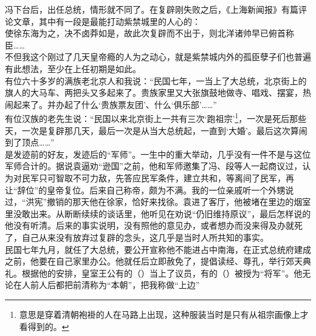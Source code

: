 冯下台后，出任总统，情形就不同了。在复辟刚失败之后，《上海新闻报》有篇评论文章，其中有一段是最能打动紫禁城里的人心的：\\

使徐东海为之，决不卤莽如是，故此次复辟而不出于，则北洋诸帅早已俯首称臣……\\

不但我这个刚过了几天皇帝瘾的人为之动心，就是紫禁城内外的孤臣孽子们也普遍有此想法，至少在上任初期是如此。\\

有位六十多岁的满族老北京人和我说：“民国七年，一当上了大总统，北京街上的旗人的大马车、两把头又多起来了。贵族家里又大张旗鼓地做寺、唱戏、摆宴，热闹起来了。并办起了什么‘贵族票友团’、什么‘俱乐部’……”\\

有位汉族的老先生说：“民国以来北京街上一共有三次‘跑祖宗’\footnote{意思是穿着清朝袍褂的人在马路上出现，这种服装当时是只有从祖宗画像上才看得到的。}，一次是死后那些天，一次是复辟那几天，最后一次是从当大总统起，一直到‘大婚’。最后这次算闹到了顶点……”\\

是发迹前的好友，发迹后的“军师”。一生中的重大举动，几乎没有一件不是与这位军师合计的。据说袁逼劝“逊国”之前，他和军师邀集了冯、段等人一起商议过，认为对民军只可智取不可力敌，先答应民军条件，建立共和，等离间了民军，再让“辞位”的皇帝复位。后来自己称帝，颇为不满。我的一位亲戚听一个外甥说过，“洪宪”撤销的那天他在徐家，恰好来找徐。袁进了客厅，他被堵在里边的烟室里没敢出来。从断断续续的谈话里，他听见在劝说“仍旧维持原议”，最后怎样说的他没有听清。后来的事实说明，没有照他的意见办，或者想办而没来得及办就死了，自己从来没有放弃过复辟的念头，这几乎是当时人所共知的事实。\\

民国七年九月，就任了大总统，要公开宣称他不能进占中南海，在正式总统府建成之前，他要在自己家里办公。他就任后立即赦免了，提倡读经、尊孔，举行郊天典礼。根据他的安排，皇室王公有的（）当上了议员，有的（）被授为“将军”。他无论在人前人后都把前清称为“本朝”，把我称做“上边”\\

